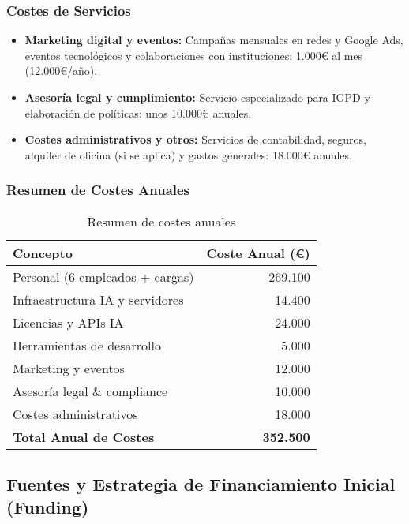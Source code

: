 \subsubsection{Costes de Servicios}

\begin{itemize}
  \item \textbf{Marketing digital y eventos:}  
  Campañas mensuales en redes y Google Ads, eventos tecnológicos y colaboraciones con instituciones: 1.000€ al mes (12.000€/año).
  
  \item \textbf{Asesoría legal y cumplimiento:}  
  Servicio especializado para IGPD y elaboración de políticas: unos 10.000€ anuales.
  
  \item \textbf{Costes administrativos y otros:}  
  Servicios de contabilidad, seguros, alquiler de oficina (si se aplica) y gastos generales: 18.000€ anuales.
\end{itemize}

\subsubsection{Resumen de Costes Anuales}

\begin{table}[H]
\centering
\begin{tabular}{|l|r|}
\hline
\textbf{Concepto} & \textbf{Coste Anual (€)} \\
\hline
Personal (6 empleados + cargas) & 269.100 \\
Infraestructura IA y servidores & 14.400 \\
Licencias y APIs IA & 24.000 \\
Herramientas de desarrollo & 5.000 \\
Marketing y eventos & 12.000 \\
Asesoría legal \& compliance & 10.000 \\
Costes administrativos & 18.000 \\
\hline
\textbf{Total Anual de Costes} & \textbf{352.500} \\
\hline
\end{tabular}
\caption{Resumen de costes anuales}
\end{table}

\subsection{Fuentes y Estrategia de Financiamiento Inicial (Funding)}

